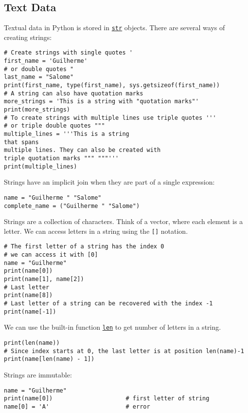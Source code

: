 \documentclass[12pt, a4paper]{article}
\begin{document}
\subsection{Text Data}
\label{sec:org996bbb2}
Textual data in Python is stored in \href{https://docs.python.org/3.6/library/stdtypes.html\#textseq}{\texttt{str}} objects.
There are several ways of creating strings:
\lstset{language=jupyter-python,label= ,caption= ,captionpos=b,numbers=none}
\begin{lstlisting}
# Create strings with single quotes '
first_name = 'Guilherme'
# or double quotes "
last_name = "Salome"
print(first_name, type(first_name), sys.getsizeof(first_name))
# A string can also have quotation marks
more_strings = 'This is a string with "quotation marks"'
print(more_strings)
# To create strings with multiple lines use triple quotes '''
# or triple double quotes """
multiple_lines = '''This is a string
that spans
multiple lines. They can also be created with
triple quotation marks """ """'''
print(multiple_lines)
\end{lstlisting}
Strings have an implicit join when they are part of a single expression:
\lstset{language=jupyter-python,label= ,caption= ,captionpos=b,numbers=none}
\begin{lstlisting}
name = "Guilherme " "Salome"
complete_name = ("Guilherme " "Salome")
\end{lstlisting}
Strings are a collection of characters.
Think of a vector, where each element is a letter.
We can access letters in a string using the \texttt{[]} notation.
\lstset{language=jupyter-python,label= ,caption= ,captionpos=b,numbers=none}
\begin{lstlisting}
# The first letter of a string has the index 0
# we can access it with [0]
name = "Guilherme"
print(name[0])
print(name[1], name[2])
# Last letter
print(name[8])
# Last letter of a string can be recovered with the index -1
print(name[-1])
\end{lstlisting}
We can use the built-in function \href{https://docs.python.org/3.6/library/functions.html?\#len}{\texttt{len}} to get number of letters in a string.
\lstset{language=jupyter-python,label= ,caption= ,captionpos=b,numbers=none}
\begin{lstlisting}
print(len(name))
# Since index starts at 0, the last letter is at position len(name)-1
print(name[len(name) - 1])
\end{lstlisting}
Strings are immutable:
\lstset{language=jupyter-python,label= ,caption= ,captionpos=b,numbers=none}
\begin{lstlisting}
name = "Guilherme"
print(name[0])                     # first letter of string
name[0] = 'A'                      # error
\end{lstlisting}
\end{document}
